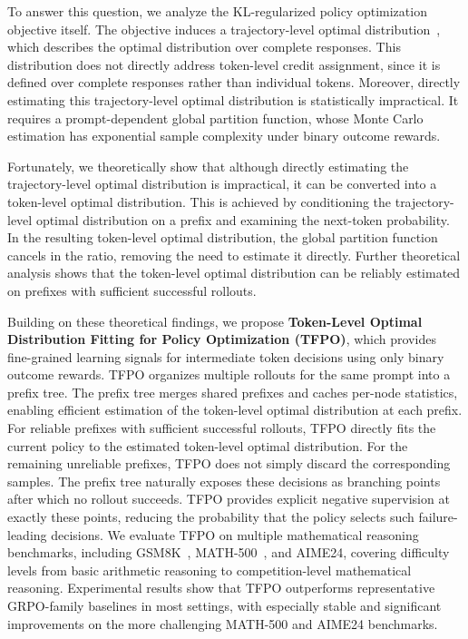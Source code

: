 \documentclass{article}
\begin{document}
To answer this question, we analyze the KL-regularized policy optimization objective itself.
The objective induces a trajectory-level optimal distribution~\citep{rafailov2023dpo}, which describes the optimal distribution over complete responses.
This distribution does not directly address token-level credit assignment, since it is defined over complete responses rather than individual tokens.
Moreover, directly estimating this trajectory-level optimal distribution is statistically impractical.
It requires a prompt-dependent global partition function, whose Monte Carlo estimation has exponential sample complexity under binary outcome rewards.

Fortunately, we theoretically show that although directly estimating the trajectory-level optimal distribution is impractical, it can be converted into a token-level optimal distribution.
This is achieved by conditioning the trajectory-level optimal distribution on a prefix and examining the next-token probability.
In the resulting token-level optimal distribution, the global partition function cancels in the ratio, removing the need to estimate it directly.
Further theoretical analysis shows that the token-level optimal distribution can be reliably estimated on prefixes with sufficient successful rollouts.

Building on these theoretical findings, we propose \textbf{Token-Level Optimal Distribution Fitting for Policy Optimization (TFPO)}, which provides fine-grained learning signals for intermediate token decisions using only binary outcome rewards.
TFPO organizes multiple rollouts for the same prompt into a prefix tree. 
The prefix tree merges shared prefixes and caches per-node statistics, enabling efficient estimation of the token-level optimal distribution at each prefix.
For reliable prefixes with sufficient successful rollouts, TFPO directly fits the current policy to the estimated token-level optimal distribution.
For the remaining unreliable prefixes, TFPO does not simply discard the corresponding samples. 
The prefix tree naturally exposes these decisions as branching points after which no rollout succeeds. TFPO provides explicit negative supervision at exactly these points, reducing the probability that the policy selects such failure-leading decisions.
We evaluate TFPO on multiple mathematical reasoning benchmarks, including GSM8K~\citep{cobbe2021gsm8k}, MATH-500~\citep{hendrycks2021math}, and AIME24, covering difficulty levels from basic arithmetic reasoning to competition-level mathematical reasoning. 
Experimental results show that TFPO outperforms representative GRPO-family baselines in most settings, with especially stable and significant improvements on the more challenging MATH-500 and AIME24 benchmarks.
\end{document}

